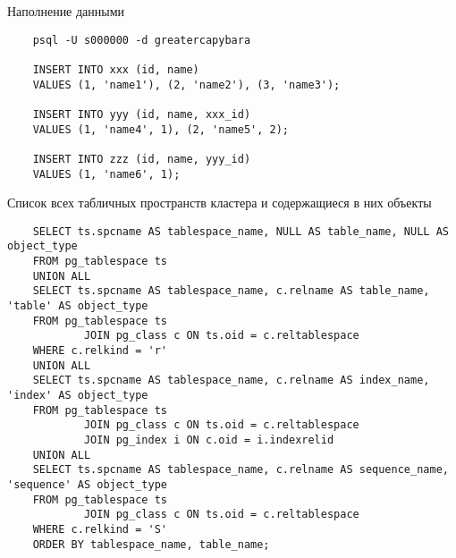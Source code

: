 \documentclass{article}
\begin{document}
Наполнение данными
\begin{verbatim}
    psql -U s000000 -d greatercapybara
    
    INSERT INTO xxx (id, name)
    VALUES (1, 'name1'), (2, 'name2'), (3, 'name3');
    
    INSERT INTO yyy (id, name, xxx_id)
    VALUES (1, 'name4', 1), (2, 'name5', 2);

    INSERT INTO zzz (id, name, yyy_id)
    VALUES (1, 'name6', 1);
\end{verbatim}
Список всех табличных пространств кластера и содержащиеся в них объекты
\begin{verbatim}
    SELECT ts.spcname AS tablespace_name, NULL AS table_name, NULL AS object_type
    FROM pg_tablespace ts
    UNION ALL
    SELECT ts.spcname AS tablespace_name, c.relname AS table_name, 'table' AS object_type
    FROM pg_tablespace ts
            JOIN pg_class c ON ts.oid = c.reltablespace
    WHERE c.relkind = 'r'
    UNION ALL
    SELECT ts.spcname AS tablespace_name, c.relname AS index_name, 'index' AS object_type
    FROM pg_tablespace ts
            JOIN pg_class c ON ts.oid = c.reltablespace
            JOIN pg_index i ON c.oid = i.indexrelid
    UNION ALL
    SELECT ts.spcname AS tablespace_name, c.relname AS sequence_name, 'sequence' AS object_type
    FROM pg_tablespace ts
            JOIN pg_class c ON ts.oid = c.reltablespace
    WHERE c.relkind = 'S'
    ORDER BY tablespace_name, table_name;
\end{verbatim}
\end{document}
